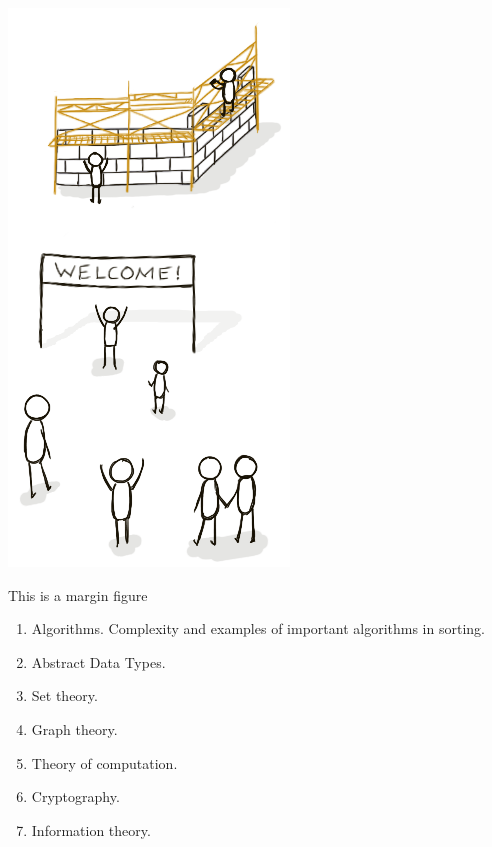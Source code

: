 \documentclass[a4paper, sfsidenotes, justified, notitlepage]{tufte-book-lite}
\begin{document}
\begin{marginfigure}
  \includegraphics[width=\linewidth]{file}
  \caption{This is a margin figure}
  \label{fig:marginfig}
\end{marginfigure}

\begin{enumerate}
\item Algorithms. Complexity and examples of important algorithms in sorting.
\item Abstract Data Types.
\item Set theory.
\item Graph theory.
\item Theory of computation.
\item Cryptography.
\item Information theory.
\end{enumerate}
\end{document}
